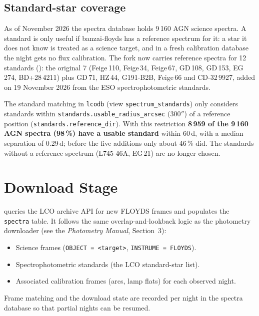\documentclass[a4paper,12pt]{article}
\begin{document}
\subsection{Standard-star coverage}

As of November 2026 the spectra database holds 9\,160 AGN science spectra.  A
standard is only useful if banzai-floyds has a reference spectrum for it: a star it
does not know is treated as a science target, and in a fresh calibration database the
night gets no flux calibration.  The fork now carries reference spectra for 12
standards (): the original 7 (Feige\,110,
Feige\,34, Feige\,67, GD\,108, GD\,153, EG\,274, BD+28\,4211) plus GD\,71, HZ\,44,
G191-B2B, Feige\,66 and CD-32\,9927, added on 19 November 2026 from the ESO
spectrophotometric standards.

The standard matching in \texttt{lcodb} (view \texttt{spectrum\_standards}) only
considers standards within \texttt{standards.usable\_radius\_arcsec} (300$''$) of a
reference position (\texttt{standards.reference\_dir}).  With this restriction
\textbf{8\,959 of the 9\,160 AGN spectra (98\,\%) have a usable standard} within
60\,d, with a median separation of 0.29\,d; before the five additions only about
46\,\% did.  The standards without a reference spectrum (L745-46A, EG\,21) are no
longer chosen.

\section{Download Stage}
\label{sec:download}

 queries the LCO archive API for new FLOYDS
frames and populates the \texttt{spectra} table.  It follows the same
overlap-and-lookback logic as the photometry downloader (see the
\emph{Photometry Manual}, Section~3):

\begin{itemize}
  \item Science frames (\texttt{OBJECT = <target>}, \texttt{INSTRUME = FLOYDS}).
  \item Spectrophotometric standards (the LCO standard-star list).
  \item Associated calibration frames (arcs, lamp flats) for each observed night.
\end{itemize}

Frame matching and the download state are recorded per night in the spectra
database so that partial nights can be resumed.
\end{document}
